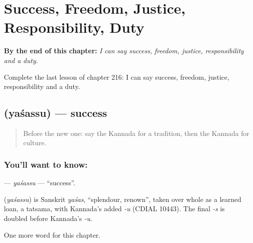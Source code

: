
\chapter{Success, Freedom, Justice, Responsibility, Duty}
\label{ch:ka-success-freedom-justice-responsibility-duty}

\begin{chapteropening}
\textbf{By the end of this chapter:} \emph{I can say success, freedom, justice, responsibility and a duty.}

Complete the last lesson of chapter 216: I can say success, freedom, justice, responsibility and a duty.
\end{chapteropening}

\section[\texorpdfstring{\kn{ಯಶಸ್ಸು} (yaśassu)}{ಯಶಸ್ಸು (yaśassu)}]{ (yaśassu) — success}

\label{lesson:KA-C216-yasassu}



\begin{quote}
Before the new one: say the Kannada for a tradition, then the Kannada for culture.
\end{quote}

\subsection*{You'll want to know: }
\textbf{} — \emph{yaśassu} — \textquotedblleft{}success\textquotedblright{}.

\begin{cousinweb}
\textbf{} (\emph{yaśassu}) is Sanskrit \emph{yaśas}, \textquotedblleft{}splendour, renown\textquotedblright{}, taken over whole as a learned loan, a tatsama, with Kannada's added \emph{-u} (CDIAL 10443). The final \emph{-s} is doubled before Kannada's \emph{-u}.
\end{cousinweb}

\begin{grammarlens}[title={What you've built}]
One more word for this chapter.
\end{grammarlens}


